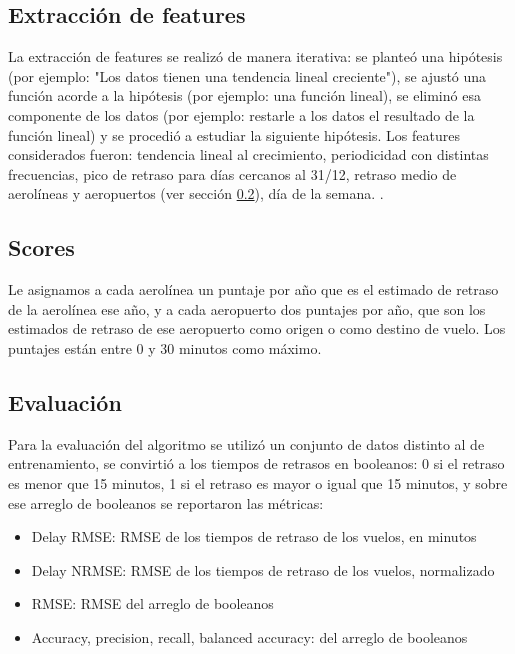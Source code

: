 \subsection{Extracci\'on de features}\label{subsec:extraccion}
La extracci\'on de features se realiz\'o de manera iterativa: se plante\'o una hip\'otesis (por ejemplo:
"Los datos tienen una tendencia lineal creciente"), se ajust\'o una funci\'on acorde a la hip\'otesis
(por ejemplo: una funci\'on lineal), se elimin\'o esa componente de los datos (por ejemplo: restarle a los datos
el resultado de la funci\'on lineal) y se procedi\'o a estudiar la siguiente hip\'otesis.
Los features considerados fueron: tendencia lineal al crecimiento, periodicidad con distintas frecuencias,
pico de retraso para d\'ias cercanos al 31/12, retraso medio de aerol\'ineas y aeropuertos
(ver secci\'on \ref{subsec:scores}), d\'ia de la semana.
.

\subsection{Scores}\label{subsec:scores}
Le asignamos a cada aerol\'inea un puntaje por a\~no que es el estimado de retraso de la aerol\'inea ese a\~no,
 y a cada aeropuerto dos puntajes por a\~no, que son los estimados de retraso de ese aeropuerto
como origen o como destino de vuelo. Los puntajes est\'an entre 0 y 30 minutos como m\'aximo.

\subsection{Evaluaci\'on}\label{subsec:evaluacion}
Para la evaluaci\'on del algoritmo se utiliz\'o un conjunto de datos distinto al de entrenamiento,
se convirti\'o a los tiempos de retrasos en booleanos: 0 si el retraso es menor que 15 minutos, 1 si el retraso
es mayor o igual que 15 minutos, y sobre ese arreglo de booleanos se reportaron las m\'etricas:
\begin{itemize}
 \item Delay RMSE: RMSE de los tiempos de retraso de los vuelos, en minutos
 \item Delay NRMSE: RMSE de los tiempos de retraso de los vuelos, normalizado
 \item RMSE: RMSE del arreglo de booleanos
 \item Accuracy, precision, recall, balanced accuracy: del arreglo de booleanos
\end{itemize}